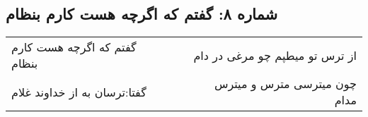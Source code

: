 \begin{center}
\section*{شماره ۸: گفتم که اگرچه هست کارم بنظام}
\label{sec:008}
\begin{longtable}{l p{0.5cm} r}
گفتم که اگرچه هست کارم بنظام
&&
از ترس تو میطپم چو مرغی در دام
\\
گفتا:‌ترسان به از خداوند غلام
&&
چون میترسی مترس و میترس مدام
\\
\end{longtable}
\end{center}

